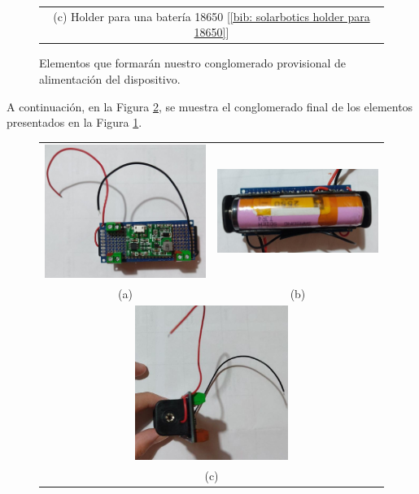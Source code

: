 \documentclass[12pt]{article}
\begin{document}
\begin{figure}[h!]
\begin{center}
\begin{tabular}{cc}
				\multicolumn{2}{c}{(c) Holder para una batería 18650 [\ref{bib: solarbotics holder para 18650}]}
			\end{tabular}
			\caption{Elementos que formarán nuestro conglomerado provisional de alimentación del dispositivo.}
			\label{Componentes conglomerado}
		\end{center}
	\end{figure}

	\noindent A continuación, en la Figura \ref{conglomerado alimentacion}, se muestra el conglomerado final de los elementos presentados en la Figura \ref{Componentes conglomerado}. \\
	
	
	\begin{figure}[h!]
		\begin{center}
			\begin{tabular}{cc}
				\includegraphics[width=60mm]{img/conglomerado_caraB_zoom.jpg} &   \includegraphics[width=60mm]{img/conglomerado_caraA_zoom.jpg} \\
				(a)  & (b)  \\[6pt]
				\multicolumn{2}{c}{\includegraphics[width=50mm]{img/conglomerado_lateral_zoom.jpg} }\\
				\multicolumn{2}{c}{(c) }
			\end{tabular}
			\caption{}
			\label{conglomerado alimentacion}
		\end{center}
	\end{figure}
\end{document}
